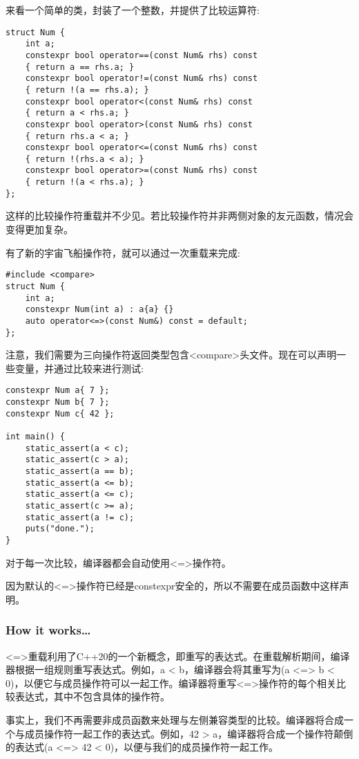 来看一个简单的类，封装了一个整数，并提供了比较运算符:

\begin{lstlisting}[style=styleCXX]
struct Num {
	int a;
	constexpr bool operator==(const Num& rhs) const
	{ return a == rhs.a; }
	constexpr bool operator!=(const Num& rhs) const
	{ return !(a == rhs.a); }
	constexpr bool operator<(const Num& rhs) const
	{ return a < rhs.a; }
	constexpr bool operator>(const Num& rhs) const
	{ return rhs.a < a; }
	constexpr bool operator<=(const Num& rhs) const
	{ return !(rhs.a < a); }
	constexpr bool operator>=(const Num& rhs) const
	{ return !(a < rhs.a); }
};
\end{lstlisting}

这样的比较操作符重载并不少见。若比较操作符并非两侧对象的友元函数，情况会变得更加复杂。

有了新的宇宙飞船操作符，就可以通过一次重载来完成:

\begin{lstlisting}[style=styleCXX]
#include <compare>
struct Num {
	int a;
	constexpr Num(int a) : a{a} {}
	auto operator<=>(const Num&) const = default;
};
\end{lstlisting}

注意，我们需要为三向操作符返回类型包含<compare>头文件。现在可以声明一些变量，并通过比较来进行测试:

\begin{lstlisting}[style=styleCXX]
constexpr Num a{ 7 };
constexpr Num b{ 7 };
constexpr Num c{ 42 };

int main() {
	static_assert(a < c);
	static_assert(c > a);
	static_assert(a == b);
	static_assert(a <= b);
	static_assert(a <= c);
	static_assert(c >= a);
	static_assert(a != c);
	puts("done.");
}
\end{lstlisting}

对于每一次比较，编译器都会自动使用<=>操作符。

因为默认的<=>操作符已经是constexpr安全的，所以不需要在成员函数中这样声明。

\subsubsection{How it works…}

<=>重载利用了C++20的一个新概念，即重写的表达式。在重载解析期间，编译器根据一组规则重写表达式。例如，a < b，编译器会将其重写为(a <=> b < 0)，以便它与成员操作符可以一起工作。编译器将重写<=>操作符的每个相关比较表达式，其中不包含具体的操作符。

事实上，我们不再需要非成员函数来处理与左侧兼容类型的比较。编译器将合成一个与成员操作符一起工作的表达式。例如，42 > a，编译器将合成一个操作符颠倒的表达式(a <=> 42 < 0)，以便与我们的成员操作符一起工作。

